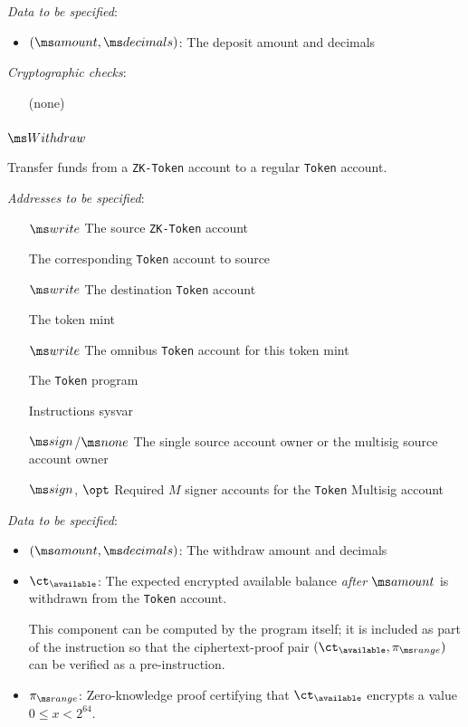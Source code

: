 \noindent
\textit{Data to be specified}:
\begin{itemize}[leftmargin=1.25cm]
  \item $(\amount, \dec)$: The deposit amount and decimals
\end{itemize}

\noindent
\textit{Cryptographic checks}:
\begin{itemize}
  \item[] (none)
\end{itemize}

\newpage
\subsubsection{$\Withdraw$}
Transfer funds from a \texttt{ZK-Token} account to a regular \texttt{Token}
account.
\vspace{0.5em}

\noindent
\textit{Addresses to be specified}:
\begin{itemize}[leftmargin=2.5cm]
  \item[$\writable$] The source \texttt{ZK-Token} account
  \item[] The corresponding \texttt{Token} account to source
  \item[$\writable$] The destination \texttt{Token} account
  \item[] The token mint
  \item[$\writable$] The omnibus \texttt{Token} account for this token mint
  \item[] The \texttt{Token} program
  \item[] Instructions sysvar
  \item[$\signer$/$\none$] The single source account owner or the multisig
    source account owner
  \item[$\signer$, $\opt$]  Required $M$ signer accounts for the \texttt{Token} Multisig
    account
\end{itemize}

\noindent
\textit{Data to be specified}:
\begin{itemize}
  \item $(\amount, \dec)$: The withdraw amount and decimals

  \item $\ct_\available$: The expected encrypted available balance
    \emph{after} $\amount$ is withdrawn from the \texttt{Token} account.

    This component can be computed by the program itself; it is included
    as part of the instruction so that the ciphertext-proof pair
    $(\ct_\available, \pirange)$ can be verified as a pre-instruction.

  \item $\pirange$: Zero-knowledge proof certifying that $\ct_\available$
    encrypts a value $0 \le x < 2^{64}$.
\end{itemize}

